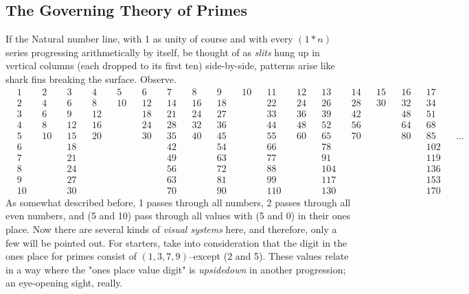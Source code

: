 \documentclass[12pt, letterpaper, twosided]{report}
\begin{document}
	\subsection{The Governing Theory of Primes}
	\hspace{0.5cm}If the Natural number line, with 1 as unity of course and with every $(1*n)$ series progressing arithmetically by itself, be thought of as \textit{slits} hung up in vertical columns (each dropped to its first ten) side-by-side, patterns arise like shark fins breaking the surface. Observe.
\begin{align*}
&1   & &2     & &3    & &4    & &5    & &6    & &7    & &8    & &9    & &10  & &11    & &12     & &13     & &14   & &15  & &16  & &17     & &\\
&2   & &4     & &6    & &8    & &10  & &12  & &14  & &16  & &18  & &      & &22    & &24     & &26     & &28   & &30  & &32  & &34     & &\\
&3   & &6     & &9    & &12  & &      & &18  & &21  & &24  & &27  & &      & &33    & &36     & &39     & &42   & &      & &48  & &51     & &\\
&4   & &8     & &12  & &16  & &      & &24  & &28  & &32  & &36  & &      & &44    & &48     & &52     & &56   & &      & &64  & &68     & &\\
&5   & &10   & &15  & &20  & &      & &30  & &35  & &40  & &45  & &      & &55    & &60     & &65     & &70   & &      & &80  & &85     & &\dots\\
&6   & &      & &18   & &      & &      & &      & &42  & &      & &54  & &      & &66    & &         & &78     & &       & &      & &      & &102   & &\\
&7   & &      & &21   & &      & &      & &      & &49  & &      & &63  & &      & &77    & &         & &91     & &       & &      & &      & &119   & &\\
&8   & &      & &24   & &      & &      & &      & &56  & &      & &72  & &      & &88    & &         & &104   & &       & &      & &      & &136   & &\\
&9   & &      & &27   & &      & &      & &      & &63  & &      & &81  & &      & &99    & &         & &117   & &       & &      & &      & &153   & &\\
&10 & &      & &30   & &      & &      & &      & &70  & &      & &90  & &      & &110  & &         & &130   & &       & &      & &      & &170   & &
\end{align*}
As somewhat described before, 1 passes through all numbers, 2 passes through all even numbers, and (5 and 10) pass through all values with (5 and 0) in their ones place. Now there are several kinds of \textit{visual systems} here, and therefore, only a few will be pointed out. For starters, take into consideration that the digit in the ones place for primes consist of $(1, 3, 7, 9)$--except (2 and 5). These values relate in a way where the "ones place value digit" is \textit{upsidedown} in another progression; an eye-opening sight, really.
\end{document}
